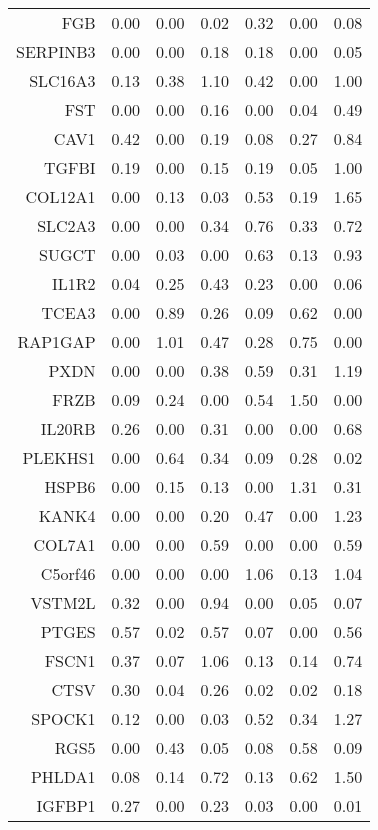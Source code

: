 \begin{longtable}{rrrrrrr}
  FGB & 0.00 & 0.00 & 0.02 & 0.32 & 0.00 & 0.08 \\ 
  SERPINB3 & 0.00 & 0.00 & 0.18 & 0.18 & 0.00 & 0.05 \\ 
  SLC16A3 & 0.13 & 0.38 & 1.10 & 0.42 & 0.00 & 1.00 \\ 
  FST & 0.00 & 0.00 & 0.16 & 0.00 & 0.04 & 0.49 \\ 
  CAV1 & 0.42 & 0.00 & 0.19 & 0.08 & 0.27 & 0.84 \\ 
  TGFBI & 0.19 & 0.00 & 0.15 & 0.19 & 0.05 & 1.00 \\ 
  COL12A1 & 0.00 & 0.13 & 0.03 & 0.53 & 0.19 & 1.65 \\ 
  SLC2A3 & 0.00 & 0.00 & 0.34 & 0.76 & 0.33 & 0.72 \\ 
  SUGCT & 0.00 & 0.03 & 0.00 & 0.63 & 0.13 & 0.93 \\ 
  IL1R2 & 0.04 & 0.25 & 0.43 & 0.23 & 0.00 & 0.06 \\ 
  TCEA3 & 0.00 & 0.89 & 0.26 & 0.09 & 0.62 & 0.00 \\ 
  RAP1GAP & 0.00 & 1.01 & 0.47 & 0.28 & 0.75 & 0.00 \\ 
  PXDN & 0.00 & 0.00 & 0.38 & 0.59 & 0.31 & 1.19 \\ 
  FRZB & 0.09 & 0.24 & 0.00 & 0.54 & 1.50 & 0.00 \\ 
  IL20RB & 0.26 & 0.00 & 0.31 & 0.00 & 0.00 & 0.68 \\ 
  PLEKHS1 & 0.00 & 0.64 & 0.34 & 0.09 & 0.28 & 0.02 \\ 
  HSPB6 & 0.00 & 0.15 & 0.13 & 0.00 & 1.31 & 0.31 \\ 
  KANK4 & 0.00 & 0.00 & 0.20 & 0.47 & 0.00 & 1.23 \\ 
  COL7A1 & 0.00 & 0.00 & 0.59 & 0.00 & 0.00 & 0.59 \\ 
  C5orf46 & 0.00 & 0.00 & 0.00 & 1.06 & 0.13 & 1.04 \\ 
  VSTM2L & 0.32 & 0.00 & 0.94 & 0.00 & 0.05 & 0.07 \\ 
  PTGES & 0.57 & 0.02 & 0.57 & 0.07 & 0.00 & 0.56 \\ 
  FSCN1 & 0.37 & 0.07 & 1.06 & 0.13 & 0.14 & 0.74 \\ 
  CTSV & 0.30 & 0.04 & 0.26 & 0.02 & 0.02 & 0.18 \\ 
  SPOCK1 & 0.12 & 0.00 & 0.03 & 0.52 & 0.34 & 1.27 \\ 
  RGS5 & 0.00 & 0.43 & 0.05 & 0.08 & 0.58 & 0.09 \\ 
  PHLDA1 & 0.08 & 0.14 & 0.72 & 0.13 & 0.62 & 1.50 \\ 
  IGFBP1 & 0.27 & 0.00 & 0.23 & 0.03 & 0.00 & 0.01 \\ 

\end{longtable}
